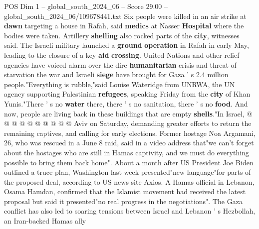 \begin{textsample}{POS Dim 1 – global\_south\_2024\_06 – Score 29.00 – global\_south\_2024\_06/109678441.txt}
Six people were killed in an air strike at \textbf{dawn} targeting a house in Rafah, said \textbf{medics} at Nasser \textbf{Hospital} where the bodies were taken.
Artillery \textbf{shelling} also rocked parts of the \textbf{city}, witnesses said.
The Israeli military launched a \textbf{ground} \textbf{operation} in Rafah in early May, leading to the closure of a key \textbf{aid} \textbf{crossing}.
United Nations and other relief agencies have voiced alarm over the dire \textbf{humanitarian} crisis and threat of starvation the war and Israeli \textbf{siege} have brought for Gaza ' s 2.4 million people."Everything is rubble,"said Louise Wateridge from UNRWA, the UN agency supporting Palestinian \textbf{refugees}, speaking Friday from the \textbf{city} of Khan Yunis."There ' s no \textbf{water} there, there ' s no sanitation, there ' s no \textbf{food}.
And now, people are living back in these buildings that are empty \textbf{shells}."In Israel, @ @ @ @ @ @ @ @ @ @ Aviv on Saturday, demanding greater efforts to return the remaining captives, and calling for early elections.
Former hostage Noa Argamani, 26, who was rescued in a June 8 raid, said in a video address that"we can't forget about the hostages who are still in Hamas captivity, and we must do everything possible to bring them back home".
About a month after US President Joe Biden outlined a truce plan, Washington last week presented"new language"for parts of the proposed deal, according to US news site Axios.
A Hamas official in Lebanon, Osama Hamdan, confirmed that the Islamist movement had received the latest proposal but said it presented"no real progress in the negotiations".
The Gaza conflict has also led to soaring tensions between Israel and Lebanon ' s Hezbollah, an Iran-backed Hamas ally

\end{textsample}
